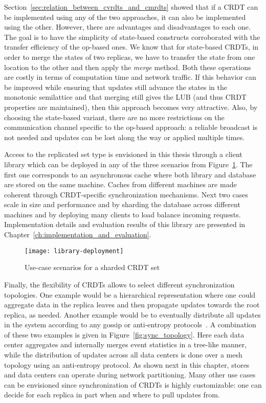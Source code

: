 Section~\ref{sec:relation_between_cvrdts_and_cmrdts} showed that if a CRDT
can be implemented using any of the two approaches, it can also be implemented
using the other. However, there are advantages and disadvantages to each one.
The goal is to have the simplicity of state-based constructs corroborated with
the transfer efficiency of the op-based ones. We know that for state-based
CRDTs, in order to merge the states of two replicas, we have to transfer the
state from one location to the other and then apply the \textit{merge} method.
Both these operations are costly in terms of computation time and network
traffic. If this behavior can be improved while ensuring that updates still
advance the states in the monotonic semilattice and that merging still gives the
LUB (and thus CRDT properties are maintained), then this approach becomes very
attractive. Also, by choosing the state-based variant, there are no more
restrictions on the communication channel specific to the op-based approach:
a reliable broadcast is not needed and updates can be lost along the way or
applied multiple times.

Access to the replicated set type is envisioned in this thesis through a client
library which can be deployed in any of the three scenarios from
Figure~\ref{fig:library_deployment}. The first one corresponds to an
asynchronous cache where both library and database are stored on the same
machine. Caches from different machines are made coherent through CRDT-specific
synchronization mechanisms. Next two cases scale in size and performance and
by sharding the database across different machines and by deploying many clients
to load balance incoming requests. Implementation details and evaluation results
of this library are presented in Chapter~\ref{ch:implementation_and_evaluation}.

\begin{figure}[t]
  \centering
  \begin{minipage}{\linewidth}
    \centering
    \texttt{[image: library-deployment]}
    \caption{Use-case scenarios for a sharded CRDT set}
    \label{fig:library_deployment}
  \end{minipage}
\end{figure}

Finally, the flexibility of CRDTs allows to select different synchronization
topologies. One example would be a hierarchical representation where one could
aggregate data in the replica leaves and then propagate updates towards the root
replica, as needed. Another example would be to eventually distribute all
updates in the system according to any gossip or anti-entropy
protocols~\cite{Demers:1987:EAR:41840.41841, Petersen:1997:FUP:268998.266711}. A
combination of these two examples is given in Figure~\ref{fig:sync_topology}.
Here each data center aggregates and internally merges event statistics in a
tree-like manner, while the distribution of updates across all data centers is
done over a mesh topology using an anti-entropy protocol. As shown next in this
chapter, stores and data centers can operate during network partitioning. Many
other use cases can be envisioned since synchronization of CRDTs is highly
customizable: one can decide for each replica in part when and where to pull
updates from.

